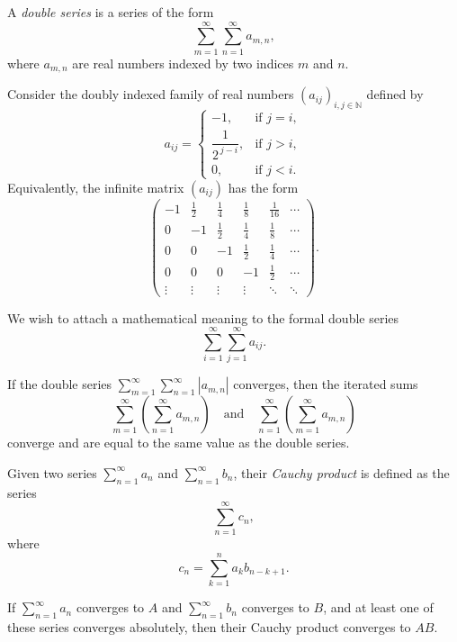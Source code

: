 \documentclass[12pt, a4paper]{article}
\begin{document}
\vspace{10pt}

\begin{definition}
	A \textit{double series} is a series of the form
	\[
	\sum_{m=1}^{\infty} \sum_{n=1}^{\infty} a_{m,n},
	\]
	where $a_{m,n}$ are real numbers indexed by two indices $m$ and $n$.
\end{definition}

\clearpage

\begin{problem}
Consider the doubly indexed family of real numbers $(a_{ij})_{i,j \in \mathbb{N}}$
defined by
\[
a_{ij} =
\begin{cases}
-1, &\text{if } j=i,\\[6pt]
\dfrac{1}{2^{\,j-i}}, &\text{if } j>i,\\[6pt]
0, &\text{if } j<i.
\end{cases}
\]
Equivalently, the infinite matrix $(a_{ij})$ has the form
\[
\begin{pmatrix}
-1 & \tfrac{1}{2} & \tfrac{1}{4} & \tfrac{1}{8} & \tfrac{1}{16} & \cdots \\
0  & -1 & \tfrac{1}{2} & \tfrac{1}{4} & \tfrac{1}{8} & \cdots \\
0  & 0  & -1 & \tfrac{1}{2} & \tfrac{1}{4} & \cdots \\
0  & 0  & 0  & -1 & \tfrac{1}{2} & \cdots \\
\vdots & \vdots & \vdots & \vdots & \ddots & \ddots
\end{pmatrix}.
\]

We wish to attach a mathematical meaning to the formal double series
\[
\sum_{i=1}^{\infty} \sum_{j=1}^{\infty} a_{ij}.
\]
\end{problem}


\clearpage

\begin{theorem}
	If the double series $\sum_{m=1}^{\infty} \sum_{n=1}^{\infty} |a_{m,n}|$ converges, then the iterated sums
	\[
	\sum_{m=1}^{\infty} \left( \sum_{n=1}^{\infty} a_{m,n} \right) \quad \text{and} \quad \sum_{n=1}^{\infty} \left( \sum_{m=1}^{\infty} a_{m,n} \right)
	\]
	converge and are equal to the same value as the double series.
\end{theorem}

\clearpage

\begin{definition}
	Given two series $\sum_{n=1}^{\infty} a_n$ and $\sum_{n=1}^{\infty} b_n$, their \textit{Cauchy product} is defined as the series
	\[
	\sum_{n=1}^{\infty} c_n,
	\]
	where
	\[
	c_n = \sum_{k=1}^{n} a_k b_{n-k+1}.
	\]
\end{definition}

\clearpage

\begin{theorem}
	If $\sum_{n=1}^{\infty} a_n$ converges to $A$ and $\sum_{n=1}^{\infty} b_n$ converges to $B$, and at least one of these series converges absolutely, then their Cauchy product converges to $AB$.
\end{theorem}

\clearpage







\EndPage
\end{document}
